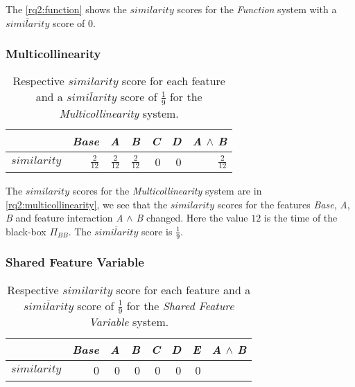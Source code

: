 The \autoref{rq2:function} shows the $similarity$ scores for the \emph{Function} system with a $\overline{similarity}$ score of $0$.

\subsubsection*{Multicollinearity}

\begin{table}[H]
    \centering
    \begin{tabular}{lrrrrrr}    \toprule
               & \emph{Base} & \emph{A} & \emph{B} & \emph{C} & \emph{D} & \emph{A} $\land$ \emph{B}   \\ \midrule
    $similarity$ & $\frac{2}{12}$ & $ \frac{2}{12}$ &  $\frac{2}{12}$ & 0 & 0 &  $\frac{2}{12}$      \\ \bottomrule
    \end{tabular}
    \caption{Respective $similarity$ score for each feature and a $\overline{similarity}$ score of $\frac{1}{9}$ for the \emph{Multicollinearity} system.}
    \label{rq2:multicollinearity}
\end{table}

The $similarity$ scores for the \emph{Multicollinearity} system are in \autoref{rq2:multicollinearity}, we see that the $similarity$
scores for the features \emph{Base}, \emph{A}, \emph{B} and feature interaction \emph{A} $\land$ \emph{B} changed. Here the 
value $12$ is the time of the black-box {\perfInfluenceModel} $\Pi_{BB}$. The $\overline{similarity}$ score is $\frac{1}{9}$.


\subsubsection*{Shared Feature Variable} %

\begin{table}[H]
    \centering
    \begin{tabular}{lrrrrrrr}    \toprule
               & \emph{Base} & \emph{A} & \emph{B} & \emph{C} & \emph{D} & \emph{E} & \emph{A} $\land$ \emph{B}   \\ \midrule
    $similarity$ & 0 & 0 & 0 & 0 & 0 & 0      \\ \bottomrule
    \end{tabular}
    \caption{Respective $similarity$ score for each feature and a $\overline{similarity}$ score of $\frac{1}{9}$ for the \emph{Shared Feature Variable} system.}
    \label{rq2:shared-feature-variable}
\end{table}

